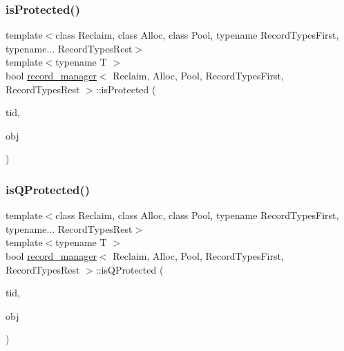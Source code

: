 \subsubsection{\texorpdfstring{is\+Protected()}{isProtected()}}
{\footnotesize\ttfamily template$<$class Reclaim, class Alloc, class Pool, typename Record\+Types\+First, typename... Record\+Types\+Rest$>$ \\
template$<$typename T $>$ \\
bool \hyperlink{classrecord__manager}{record\+\_\+manager}$<$ Reclaim, Alloc, Pool, Record\+Types\+First, Record\+Types\+Rest $>$\+::is\+Protected (\begin{DoxyParamCaption}\item[{const int}]{tid,  }\item[{T $\ast$const}]{obj }\end{DoxyParamCaption})\hspace{0.3cm}{\ttfamily [inline]}}

\mbox{\label{classrecord__manager_a0d27b8777d71bb1986ee822fa8db0de6}} 
\subsubsection{\texorpdfstring{is\+Q\+Protected()}{isQProtected()}}
{\footnotesize\ttfamily template$<$class Reclaim, class Alloc, class Pool, typename Record\+Types\+First, typename... Record\+Types\+Rest$>$ \\
template$<$typename T $>$ \\
bool \hyperlink{classrecord__manager}{record\+\_\+manager}$<$ Reclaim, Alloc, Pool, Record\+Types\+First, Record\+Types\+Rest $>$\+::is\+Q\+Protected (\begin{DoxyParamCaption}\item[{const int}]{tid,  }\item[{T $\ast$const}]{obj }\end{DoxyParamCaption})\hspace{0.3cm}{\ttfamily [inline]}}

\mbox{\label{classrecord__manager_a70c5aa0cc460e1d8e3ed01e136fa5378}} 
